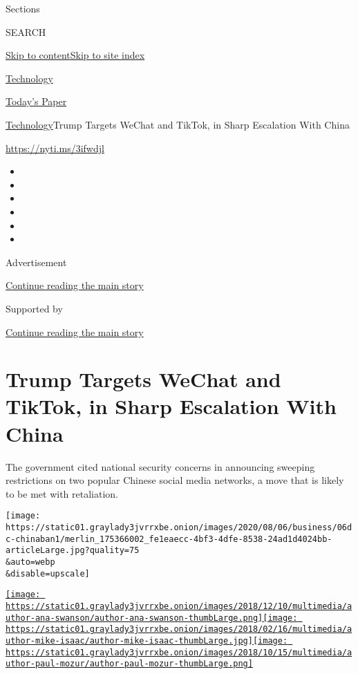 Sections

SEARCH

\protect\hyperlink{site-content}{Skip to
content}\protect\hyperlink{site-index}{Skip to site index}

\href{https://www.nytimes3xbfgragh.onion/section/technology}{Technology}

\href{https://myaccount.nytimes3xbfgragh.onion/auth/login?response_type=cookie\&client_id=vi}{}

\href{https://www.nytimes3xbfgragh.onion/section/todayspaper}{Today's
Paper}

\href{/section/technology}{Technology}\textbar{}Trump Targets WeChat and
TikTok, in Sharp Escalation With China

\href{https://nyti.ms/3ifwdjl}{https://nyti.ms/3ifwdjl}

\begin{itemize}
\item
\item
\item
\item
\item
\item
\end{itemize}

Advertisement

\protect\hyperlink{after-top}{Continue reading the main story}

Supported by

\protect\hyperlink{after-sponsor}{Continue reading the main story}

\hypertarget{trump-targets-wechat-and-tiktok-in-sharp-escalation-with-china}{%
\section{Trump Targets WeChat and TikTok, in Sharp Escalation With
China}\label{trump-targets-wechat-and-tiktok-in-sharp-escalation-with-china}}

The government cited national security concerns in announcing sweeping
restrictions on two popular Chinese social media networks, a move that
is likely to be met with retaliation.

\texttt{[image: https://static01.graylady3jvrrxbe.onion/images/2020/08/06/business/06dc-chinaban1/merlin\_175366002\_fe1eaecc-4bf3-4dfe-8538-24ad1d4024bb-articleLarge.jpg?quality=75\\\&auto=webp\\\&disable=upscale]}

\href{https://www.nytimes3xbfgragh.onion/by/ana-swanson}{\texttt{[image: https://static01.graylady3jvrrxbe.onion/images/2018/12/10/multimedia/author-ana-swanson/author-ana-swanson-thumbLarge.png]}}\href{https://www.nytimes3xbfgragh.onion/by/mike-isaac}{\texttt{[image: https://static01.graylady3jvrrxbe.onion/images/2018/02/16/multimedia/author-mike-isaac/author-mike-isaac-thumbLarge.jpg]}}\href{https://www.nytimes3xbfgragh.onion/by/paul-mozur}{\texttt{[image: https://static01.graylady3jvrrxbe.onion/images/2018/10/15/multimedia/author-paul-mozur/author-paul-mozur-thumbLarge.png]}}


